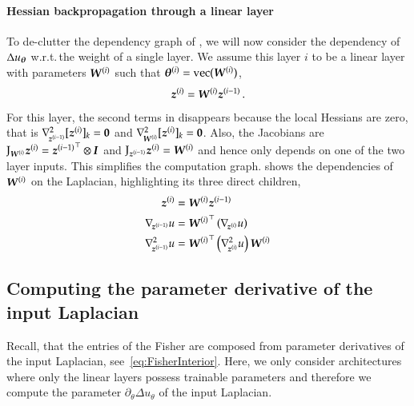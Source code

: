 \paragraph{Hessian backpropagation through a linear layer} To de-clutter the dependency graph of , we will now consider the dependency of $\Delta u_{{\boldsymbol{\theta}}}$ w.r.t.\,the weight of a single layer.
We assume this layer $i$ to be a linear layer with parameters ${\boldsymbol{W}}^{(i)}$ such that ${\boldsymbol{\theta}}^{(i)} = \operatorname{vec}({\boldsymbol{W}}^{(i)})$,
\begin{align}
  {\boldsymbol{z}}^{(i)} = {\boldsymbol{W}}^{(i)} {\boldsymbol{z}}^{(i-1)}\,.
\end{align}
For this layer, the second terms in  disappears because the local Hessians are zero, that is $\nabla_{\!{{\boldsymbol{z}}^{(i-1)}}}^{2}[{\boldsymbol{z}}^{(i)}]_k = {\boldsymbol{0}}$ and $\nabla_{\!{{\boldsymbol{W}}^{(i)}}}^{2}[{\boldsymbol{z}}^{(i)}]_k = {\boldsymbol{0}}$.
Also, the Jacobians are $\mathrm{J}_{{\boldsymbol{W}}^{(i)}}{\boldsymbol{z}}^{(i)} = {{\boldsymbol{z}}^{(i-1)}}^{\top} \otimes {\boldsymbol{I}}$ and $\mathrm{J}_{{\boldsymbol{z}}^{(i-1)}}{\boldsymbol{z}}^{(i)} = {\boldsymbol{W}}^{(i)}$ and hence only depends on one of the two layer inputs.
This simplifies the computation graph.
 shows the dependencies of ${\boldsymbol{W}}^{(i)}$ on the
Laplacian, highlighting its three direct children,
\begin{align}\label{eq:spatialDerivatives}
  \begin{split}
    {\boldsymbol{z}}^{(i)}
    &=
      {\boldsymbol{W}}^{(i)} {\boldsymbol{z}}^{(i-1)}
    \\
    \nabla_{\!{{\boldsymbol{z}}^{(i-1)}}}u
    &=
      {{\boldsymbol{W}}^{(i)}}^{\top}
      \left(
      \nabla_{\!{{\boldsymbol{z}}^{(i)}}}u
      \right)
    \\
    \nabla_{\!{{\boldsymbol{z}}^{(i-1)}}}^{2}u
    &=
      {{\boldsymbol{W}}^{(i)}}^{\top}
      \left(
      \nabla_{\!{{\boldsymbol{z}}^{(i)}}}^{2}u
      \right)
      {\boldsymbol{W}}^{(i)}
  \end{split}
\end{align}

\subsection{Computing the parameter derivative of the input Laplacian}
Recall, that the entries of the Fisher are composed from parameter derivatives of the input Laplacian, see~\eqref{eq:FisherInterior}.
Here, we only consider architectures where only the linear layers possess trainable parameters and therefore we compute the parameter $\partial_{\theta} \Delta u_\theta$ of the input Laplacian.

